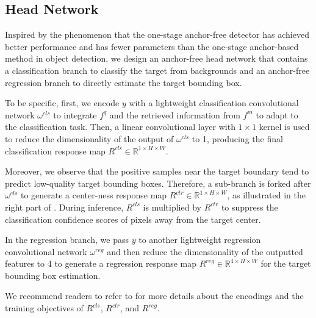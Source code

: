 \documentclass[final]{cvpr}
\begin{document}
\subsection{Head Network}\label{subsec:head-network}
Inspired by the phenomenon that the one-stage anchor-free detector \cite{tian2019fcos} has achieved better performance and has fewer parameters than the one-stage anchor-based method \cite{lin2017focal} in object detection, we design an anchor-free head network that contains a classification branch to classify the target from backgrounds and an anchor-free regression branch to directly estimate the target bounding box.
\par
To be specific, first, we encode $y$ with a lightweight classification convolutional network $\omega^{cls}$ to integrate $f^{q}$ and the retrieved information from $f^{m}$ to adapt to the classification task.
Then, a linear convolutional layer with $1 \times 1$ kernel is used to reduce the dimensionality of the output of $\omega^{cls}$ to 1, producing the final classification response map $R^{cls} \in \mathbb{R}^{1 \times H \times W}$.
\par
Moreover, we observe that the positive samples near the target boundary tend to predict low-quality target bounding boxes.
Therefore, a sub-branch is forked after $\omega^{cls}$ to generate a center-ness response map $R^{ctr} \in \mathbb{R}^{1 \times H \times W}$, as illustrated in the right part of .
During inference, $R^{cls}$ is multiplied by $R^{ctr}$ to suppress the classification confidence scores of pixels away from the target center.
\par
In the regression branch, we pass $y$ to another lightweight regression convolutional network $\omega^{reg}$ and then reduce the dimensionality of the outputted features to 4 to generate a regression response map $R^{reg} \in \mathbb{R}^{4 \times H \times W}$ for the target bounding box estimation.
\par
We recommend readers to refer to \cite{xu2020siamfc++} for more details about the encodings and the training objectives of $R^{cls}$, $R^{ctr}$, and $R^{reg}$.

\end{document}
